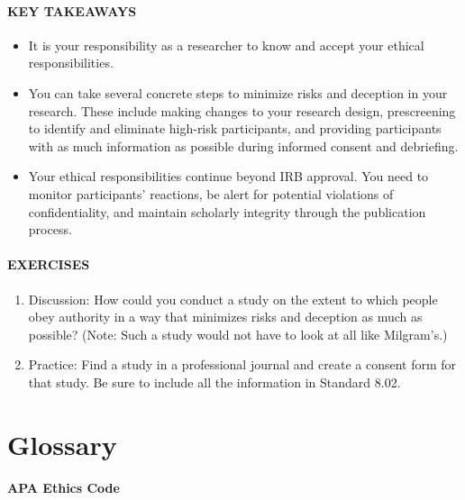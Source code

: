 \documentclass[
]{krantz}
\providecommand{\tightlist}{%
  \setlength{\itemsep}{0pt}\setlength{\parskip}{0pt}}
\begin{document}
\hypertarget{key-takeaways-10}{%
\paragraph*{KEY TAKEAWAYS}\label{key-takeaways-10}}

\begin{itemize}
\tightlist
\item
  It is your responsibility as a researcher to know and accept your ethical responsibilities.
\item
  You can take several concrete steps to minimize risks and deception in your research. These include making changes to your research design, prescreening to identify and eliminate high-risk participants, and providing participants with as much information as possible during informed consent and debriefing.
\item
  Your ethical responsibilities continue beyond IRB approval. You need to monitor participants' reactions, be alert for potential violations of confidentiality, and maintain scholarly integrity through the publication process.
\end{itemize}

\hypertarget{exercises-9}{%
\paragraph*{EXERCISES}\label{exercises-9}}

\begin{enumerate}
\def\labelenumi{\arabic{enumi}.}
\tightlist
\item
  Discussion: How could you conduct a study on the extent to which people obey authority in a way that minimizes risks and deception as much as possible? (Note: Such a study would not have to look at all like Milgram's.)
\item
  Practice: Find a study in a professional journal and create a consent form for that study. Be sure to include all the information in Standard 8.02.
\end{enumerate}

\hypertarget{glossary-3}{%
\section{Glossary}\label{glossary-3}}

\hypertarget{apa-ethics-code-2}{%
\paragraph*{APA Ethics Code}\label{apa-ethics-code-2}}
\end{document}
